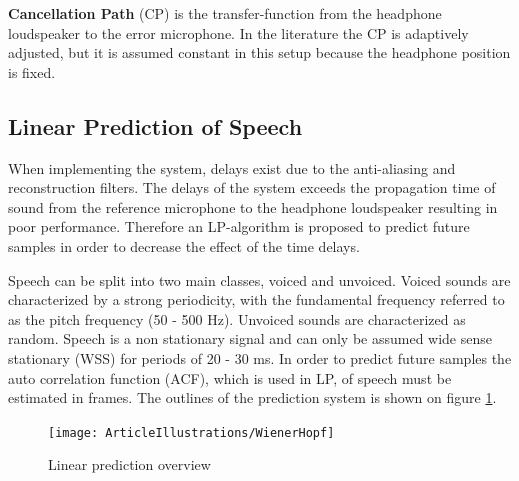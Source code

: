 \textbf{Cancellation Path} (CP) is the transfer-function from the headphone loudspeaker to the error microphone. In the literature \cite{Hansen} the CP is adaptively adjusted, but it is assumed constant in this setup because the headphone position is fixed.     

\subsection*{Linear Prediction of Speech}
When implementing the system, delays exist due to the anti-aliasing and reconstruction filters. The delays of the system exceeds the propagation time of sound from the reference microphone to the headphone loudspeaker resulting in poor performance. Therefore an LP-algorithm is proposed to predict future samples in order to decrease the effect of the time delays.


Speech can be split into two main classes, voiced and unvoiced. Voiced sounds are characterized by a strong periodicity, with the fundamental frequency referred to as the pitch frequency (50 - 500 Hz). Unvoiced sounds are characterized as random. Speech is a non stationary signal and can only be assumed wide sense stationary (WSS) for periods of 20 - 30 ms. In order to predict future samples the auto correlation function (ACF), which is used in LP, of speech must be estimated in frames. The outlines of the prediction system is shown on figure \ref{fig:LinearPredictionOverview}.

\begin{figure}[H]
	\centering
	\texttt{[image: ArticleIllustrations/WienerHopf]}
	\caption{Linear prediction overview}
	\label{fig:LinearPredictionOverview}
\end{figure}


